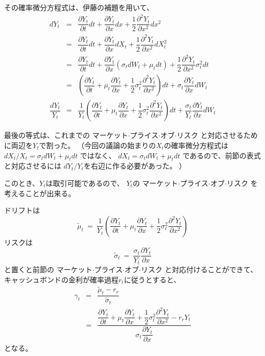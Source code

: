 \documentclass[uplatex,a4j,12pt,dvipdfmx]{jsarticle}
\begin{document}
その確率微分方程式は、伊藤の補題を用いて、
%
%
\begin{eqnarray*}
	d Y_{t}
	&=&
	\dfrac{ \partial Y_{t} }{ \partial t }
	dt
	+
	\dfrac{ \partial Y_{t} }{ \partial x }
	dx
	+
	\dfrac{1}{2}
	\dfrac{ \partial^{2} Y_{t} }{ \partial x^{2} }
	dx^{2}
	\\ &=&
	\dfrac{ \partial Y_{t} }{ \partial t }
	dt
	+
	\dfrac{ \partial Y_{t} }{ \partial x }
	dX_{t}
	+
	\dfrac{1}{2}
	\dfrac{ \partial^{2} Y_{t} }{ \partial x^{2} }
	dX_{t}^{2}
	\\ &=&
	\dfrac{ \partial Y_{t} }{ \partial t }
	dt
	+
	\dfrac{ \partial Y_{t} }{ \partial x }
	(\sigma_{t} d W_{t} + \mu_{t} dt)
	+
	\dfrac{1}{2}
	\dfrac{ \partial^{2} Y_{t} }{ \partial x^{2} }
	\sigma_{t}^{2} dt
	\\ &=&
	\left(
	\dfrac{ \partial Y_{t} }{ \partial t }
	+
	\mu_{t}
	\dfrac{ \partial Y_{t} }{ \partial x }
	+
	\dfrac{1}{2}
	\sigma_{t}^{2}
	\dfrac{ \partial^{2} Y_{t} }{ \partial x^{2} }
	\right)
	dt
	+
	\sigma_{t}
	\dfrac{ \partial Y_{t} }{ \partial x }
	dW_{t}
	\\
	\dfrac{dY_{t}}{Y_{t}}
	&=&
	\dfrac{1}{Y_{t}}
	\left(
	\dfrac{ \partial Y_{t} }{ \partial t }
	+
	\mu_{t}
	\dfrac{ \partial Y_{t} }{ \partial x }
	+
	\dfrac{1}{2}
	\sigma_{t}^{2}
	\dfrac{ \partial^{2} Y_{t} }{ \partial x^{2} }
	\right)
	dt
	+
	\dfrac{\sigma_{t}}{Y_{t}}
	\dfrac{ \partial Y_{t} }{ \partial x }
	dW_{t}
\end{eqnarray*}
%
%

最後の等式は、これまでの
マーケット$\cdot$プライス$\cdot$オブ$\cdot$リスク
と対応させるために両辺を$Y_{t}$で割った。
（今回の議論の始まりの$X_{t}$の確率微分方程式は
$dX_{t}/X_{t}=\sigma_{t} d W_{t} + \mu_{t} dt$
ではなく、
$dX_{t}=\sigma_{t} d W_{t} + \mu_{t} dt$
であるので、前節の表式と対応させるには
$dY_{t}/Y_{t}$を右辺に作る必要があった。
）

このとき、$Y_{t}$は取引可能であるので、
$Y_{t}$の
マーケット$\cdot$プライス$\cdot$オブ$\cdot$リスク
を考えることが出来る。

ドリフトは
$$
	\tilde{\mu}_{t}
	\ = \
	\dfrac{1}{Y_{t}}
	\left(
	\dfrac{ \partial Y_{t} }{ \partial t }
	+
	\mu_{t}
	\dfrac{ \partial Y_{t} }{ \partial x }
	+
	\dfrac{1}{2}
	\sigma_{t}^{2}
	\dfrac{ \partial^{2} Y_{t} }{ \partial x^{2} }
	\right)
$$
リスクは
$$
	\tilde{\sigma}_{t}
	\ = \
	\dfrac{\sigma_{t}}{Y_{t}}
	\dfrac{ \partial Y_{t} }{ \partial x }
$$
と置くと前節の
マーケット$\cdot$プライス$\cdot$オブ$\cdot$リスク
と対応付けることができて、
キャッシュボンドの金利が確率過程$r_{t}$に従うとすると、
%
%
\begin{eqnarray*}
	\gamma_{t}
	&=&
	\dfrac{\tilde{\mu}_{t} - r_{r}}{ \tilde{\sigma}_{t} }
	\\ &=&
	\dfrac{
		\dfrac{ \partial Y_{t} }{ \partial t }
		+
		\mu_{t}
		\dfrac{ \partial Y_{t} }{ \partial x }
		+
		\dfrac{1}{2}
		\sigma_{t}^{2}
		\dfrac{ \partial^{2} Y_{t} }{ \partial x^{2} } - r_{r} Y_{t}
	}
	{ \sigma_{t}
		\dfrac{ \partial Y_{t} }{ \partial x }
	}
\end{eqnarray*}
%
%
となる。
\end{document}
